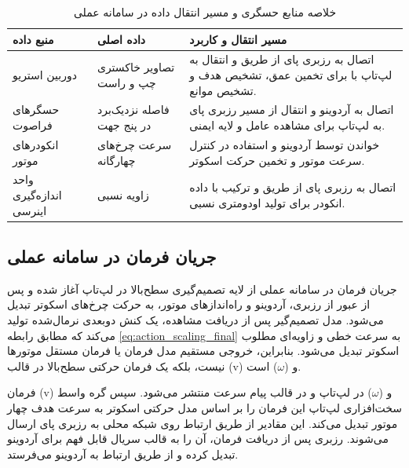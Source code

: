 \begin{table}[htbp]
	\centering
	\caption{خلاصه منابع حسگری و مسیر انتقال داده در سامانه عملی}
	\label{tab:real_sensor_data_paths}
	\begin{tabular}{|p{}|p{}|p{}|}
		\hline
		\textbf{منبع داده} &
		\textbf{داده اصلی} &
		\textbf{مسیر انتقال و کاربرد} \\
		\hline
		دوربین استریو &
		تصاویر خاکستری چپ و راست &
		اتصال به رزبری پای از طریق \lr{CSI} و انتقال به لپ‌تاپ با \lr{GStreamer} برای تخمین عمق، تشخیص هدف و تشخیص موانع. \\
		\hline
		
		حسگرهای فراصوت &
		فاصله نزدیک‌برد در پنج جهت &
		اتصال به آردوینو و انتقال از مسیر رزبری پای به لپ‌تاپ برای مشاهده عامل و لایه ایمنی. \\
		\hline
		
		انکودرهای موتور &
		سرعت چرخ‌های چهارگانه &
		خواندن توسط آردوینو و استفاده در کنترل سرعت موتور و تخمین حرکت اسکوتر. \\
		\hline
		
		واحد اندازه‌گیری اینرسی &
		زاویه نسبی \lr{yaw} &
		اتصال به رزبری پای از طریق \lr{USB} و ترکیب با داده انکودر برای تولید اودومتری نسبی. \\
		\hline
		
	\end{tabular}
	
	
\end{table}


\subsection{جریان فرمان در سامانه عملی}
\label{subsec:real_command_flow}

جریان فرمان در سامانه عملی از لایه تصمیم‌گیری سطح‌بالا در لپ‌تاپ آغاز شده و پس از عبور از رزبری، آردوینو و راه‌اندازهای موتور، به حرکت چرخ‌های اسکوتر تبدیل می‌شود. مدل تصمیم‌گیر  پس از دریافت مشاهده، یک کنش دوبعدی نرمال‌شده تولید می‌کند که مطابق رابطه \ref{eq:action_scaling_final} به سرعت خطی و زاویه‌ای مطلوب اسکوتر تبدیل می‌شود. بنابراین، خروجی مستقیم مدل فرمان  یا فرمان مستقل موتورها نیست، بلکه یک فرمان حرکتی سطح‌بالا در قالب (v) و ($\omega$) است.

فرمان (v) و ($\omega$) در لپ‌تاپ و در قالب پیام سرعت منتشر می‌شود. سپس گره واسط سخت‌افزاری لپ‌تاپ این فرمان را بر اساس مدل حرکتی اسکوتر به سرعت هدف چهار موتور تبدیل می‌کند. این مقادیر از طریق ارتباط  روی شبکه محلی به رزبری پای ارسال می‌شوند. رزبری پس از دریافت فرمان، آن را به قالب سریال قابل فهم برای آردوینو تبدیل کرده و از طریق ارتباط  به آردوینو می‌فرستد.

